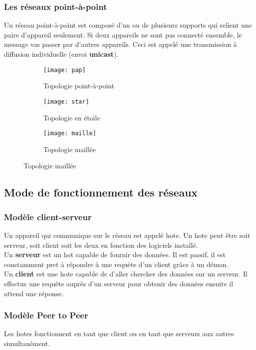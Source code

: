 \documentclass[10pt,a4paper]{article}
\begin{document}
 \subsubsection{Les réseaux point-à-point}
 Un réseau point-à-point est composé d'un ou de plusieurs supports qui relient une paire d'appareil seulement.
 Si deux appareils ne sont pas connecté ensemble, le message vas passer par d'autres appareils. Ceci est appelé une transmission à diffusion individuelle (envoi \textbf{unicast}).
 \begin{figure}[h]
	 \begin{subfigure}{.5\textwidth}
		 \centering
		 \texttt{[image: pap]}
		 \caption{Topologie point-à-point}
	 \end{subfigure}
	 \begin{subfigure}{.5\textwidth}
		 \centering
		 \texttt{[image: star]}
		 \caption{Topologie en étoile}
	 \end{subfigure}
	 \begin{subfigure}{.5\textwidth}
		 \centering
		 \texttt{[image: maille]}
		 \caption{Topologie maillée}
	 \end{subfigure}
 \end{figure}

 \subsection{Mode de fonctionnement des réseaux}
 \subsubsection{Modèle client-serveur}
 Un appareil qui communique sur le réseau est appelé hote. Un hote peut être soit serveur, soit client soit les deux en fonction des logiciels installé.\\
 Un \textbf{serveur} est un hot capable de fournir des données. Il est passif, il est constamment pret à répondre à une requète d'un client grâce à un démon.\\
 Un \textbf{client} est une hote capable de d'aller chercher des données sur un serveur. Il effectue une requète auprès d'un serveur pour obtenir des données ensuite il attend une réponse.\\

 \subsubsection{Modèle Peer to Peer}
 Les hotes fonctionnent en tant que client ou en tant que serveurs aux autres simultanément.
\end{document}
